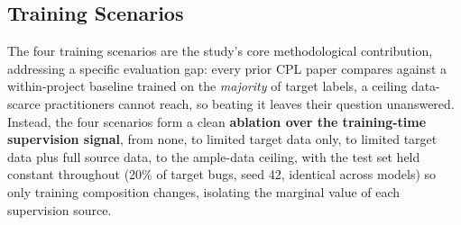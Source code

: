 \documentclass[a4paper,fleqn]{cas-dc}
\begin{document}
\subsection{Training Scenarios}
\label{sec:scenarios}

 The four training scenarios are the study's core methodological
contribution, addressing a specific evaluation gap: every prior CPL paper
compares against a within-project baseline trained on the \emph{majority}
of target labels, a ceiling data-scarce practitioners cannot reach, so
beating it leaves their question unanswered. Instead, the four scenarios form a
clean \textbf{ablation over the training-time supervision signal}, from
none, to limited target data only, to limited target data plus full source
data, to the ample-data ceiling, with the test set held constant throughout
(20\% of target bugs, seed 42, identical across models) so only training
composition changes, isolating the marginal value of each supervision
source.
\end{document}
